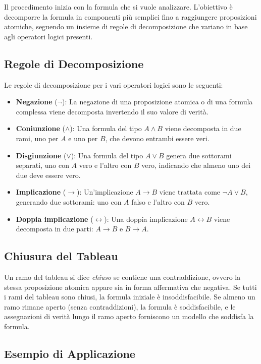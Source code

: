 \documentclass{article}
\begin{document}
Il procedimento inizia con la formula che si vuole analizzare. L'obiettivo è decomporre la formula in componenti più semplici fino a raggiungere proposizioni atomiche, seguendo un insieme di regole di decomposizione che variano in base agli operatori logici presenti.

\subsection{Regole di Decomposizione}

Le regole di decomposizione per i vari operatori logici sono le seguenti:

\begin{itemize}
    \item \textbf{Negazione} ($\neg$): La negazione di una proposizione atomica o di una formula complessa viene decomposta invertendo il suo valore di verità.
    \item \textbf{Coniunzione} ($\land$): Una formula del tipo $A \land B$ viene decomposta in due rami, uno per $A$ e uno per $B$, che devono entrambi essere veri.
    \item \textbf{Disgiunzione} ($\lor$): Una formula del tipo $A \lor B$ genera due sottorami separati, uno con $A$ vero e l'altro con $B$ vero, indicando che almeno uno dei due deve essere vero.
    \item \textbf{Implicazione} ($\to$): Un'implicazione $A \to B$ viene trattata come $\neg A \lor B$, generando due sottorami: uno con $A$ falso e l'altro con $B$ vero.
    \item \textbf{Doppia implicazione} ($\leftrightarrow$): Una doppia implicazione $A \leftrightarrow B$ viene decomposta in due parti: $A \to B$ e $B \to A$.
\end{itemize}

\subsection{Chiusura del Tableau}

Un ramo del tableau si dice \textit{chiuso} se contiene una contraddizione, ovvero la stessa proposizione atomica appare sia in forma affermativa che negativa. Se tutti i rami del tableau sono chiusi, la formula iniziale è insoddisfacibile. Se almeno un ramo rimane aperto (senza contraddizioni), la formula è soddisfacibile, e le assegnazioni di verità lungo il ramo aperto forniscono un modello che soddisfa la formula.

\subsection{Esempio di Applicazione}
\end{document}
